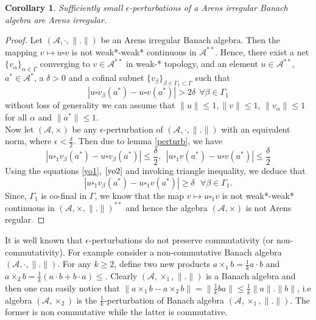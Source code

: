 \documentclass[pdflatex,sn-mathphys-num]{sn-jnl}%
\theoremstyle{thmstyleone}%
\theoremstyle{thmstyletwo}%
\theoremstyle{thmstylethree}%
\newtheorem{corollary}{Corollary}
\begin{document}
 \begin{corollary}\label{cor1}
 	Sufficiently small $\epsilon$-perturbations of a Arens irregular Banach algebra are Arens irregular.
 \end{corollary}
 \begin{proof}
 	Let $(\mathcal A, \cdot, \|.\|)$ be an Arens irregular Banach algebra. Then the mapping $v\mapsto u\square v$ is not weak*-weak* continuous in $\mathcal A^{**}$. Hence, there exist a net $\{v_\alpha\}_{\alpha\in \Gamma}$ converging to $v\in \mathcal A^{**}$ in weak-* topology, and an element $u\in \mathcal A^{**}$,  $a^*\in \mathcal A^*$, a $\delta>0$ and a cofinal subnet $\{v_{\beta}\}_{\beta\in \Gamma_1\subset \Gamma}$ such that \begin{equation}\label{yo1}
 		|u\square v_\beta(a^*) -u\square v(a^*)|>2\delta~~\forall \beta\in \Gamma_1
 	\end{equation}
 	without loss of generality we can assume that $\|u\|\leq 1, \|v\|\leq 1$, $\|v_\alpha\|\leq 1$ for all $\alpha$ and $\|a^*\|\leq 1$. \\
 	Now let $(\mathcal A, \times)$ be any $\epsilon$-perturbation of $(\mathcal A, \cdot, \|.\|)$ with an equivalent norm, where $\epsilon<\frac{\delta}{2}$. Then due to lemma \ref{perturb}, we have \begin{equation}\label{yo2}
 		|u\square_1v_\beta(a^*)-u\square v_\beta(a^*)|\leq \frac{\delta}{2},~~	|u\square_1v(a^*)-u\square v(a^*)|\leq \frac{\delta}{2}
 	\end{equation}
 	Using the equations \ref{yo1}, $\ref{yo2}$ and invoking triangle inequality, we deduce that 
$$|u\square_1 v_\beta(a^*)-u\square_1v(a^*)|\geq \delta~~~\forall \beta\in \Gamma_1.$$
Since, $\Gamma_1$  is co-final in $\Gamma$, we know that the map $v\mapsto u\square_1 v$ is not weak*-weak* continuous in $(\mathcal A, \times, \|.\|)^{**}$ and hence the algebra $(\mathcal A, \times)$ is not Arens regular.
 \end{proof}
 It is well known that $\epsilon$-perturbations do not preserve commutativity (or non-commutativity). For example consider a non-commutative Banach algebra $(\mathcal A,\cdot, \|.\|)$. For any $k\geq 2$, define two new products $a\times_1 b=\frac{1}{k}a\cdot b$ and $a\times_2 b=\frac{1}{k}(a\cdot b+b\cdot a)\leq $. Clearly $(\mathcal A, \times_1, \|.\|)$ is a Banach algebra and then one can easily notice that $\|a\times_1 b-a\times_2 b\|=\|\frac{1}{k}ba\|\leq \frac{1}{k}\|a\|.\|b\|$, i.e algebra $(\mathcal A, \times_2)$ is the $\frac{1}{k}$-perturbation of Banach algebra $(\mathcal A, \times_1,\|.\|)$. The former is non commutative while the latter is commutative.\\
 
\end{document}
